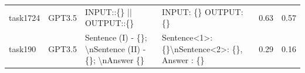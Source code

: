 \begin{longtable}{@{}p{0.8cm\tiny}p{1cm\tiny}p{4.1cm\ttfamily\tiny}p{4.1cm\ttfamily\tiny}p{0.8cm\tiny}p{0.8cm\tiny}@{}}
task1724  & GPT3.5    & INPUT::\{\} || OUTPUT::\{\}                                                                                                                                                                                                                                                                                                                                                                                                                                                                                             & INPUT: \{\} OUTPUT: \{\}                                                                                                                                                                                                                                                                                                                                                                                                                                                                                                                                                          & 0.63 & 0.57 \\
task190   & GPT3.5    & Sentence  (I) - \{\}; \textbackslash{}nSentence  (II) - \{\}; \textbackslash{}nAnswer \{\}                                                                                                                                                                                                                                                                                                                                                                                                                              & Sentence\textless{}1\textgreater{}: \{\}\textbackslash{}nSentence\textless{}2\textgreater{}: \{\}, Answer : \{\}                                                                                                                                                                                                                                                                                                                                                                                                                                                                  & 0.29 & 0.16 \\

\end{longtable}
